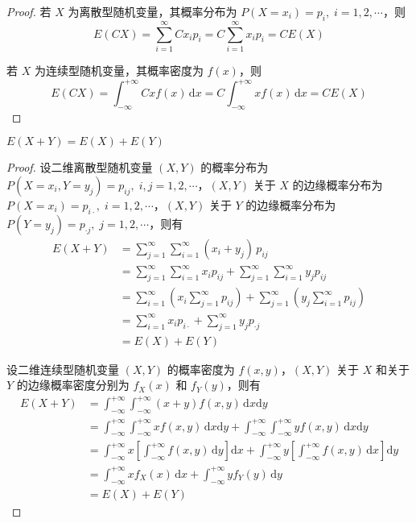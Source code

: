 \begin{proof}
    若 $X$ 为离散型随机变量，其概率分布为 $P(X=x_i)=p_i, \; i=1,2,\cdots$，则
    $$
    E(CX) = \sum_{i=1}^{\infty} C x_i p_i = C \sum_{i=1}^{\infty} x_i p_i = CE(X)
    $$

    若 $X$ 为连续型随机变量，其概率密度为 $f(x)$，则
    $$
    E(CX) = \int_{-\infty}^{+\infty} Cx f(x) \, \text{d}x = C \int_{-\infty}^{+\infty} x f(x) \, \text{d}x = CE(X)
    $$
\end{proof}

\begin{property}[][][property:E(X+Y)=E(X)+E(Y)]
    \indent $E(X+Y)=E(X)+E(Y)$
\end{property}

\begin{proof}
    设二维离散型随机变量 $(X,Y)$ 的概率分布为 $P(X=x_i,Y=y_j) = p_{ij}, \; i,j=1,2,\cdots$，$(X,Y)$ 关于 $X$ 的边缘概率分布为 $P(X=x_i)=p_{i\cdot}, \; i=1,2,\cdots$，$(X,Y)$ 关于 $Y$ 的边缘概率分布为 $P(Y=y_j)=p_{\cdot j}, \; j=1,2,\cdots$，则有
    $$
    \begin{aligned}
        E(X+Y) &= \sum_{j=1}^{\infty} \sum_{i=1}^{\infty} (x_i + y_j) \, p_{ij} \\
        &= \sum_{j=1}^{\infty} \sum_{i=1}^{\infty} x_i p_{ij} + \sum_{j=1}^{\infty} \sum_{i=1}^{\infty} y_j p_{ij} \\
        &= \sum_{i=1}^{\infty} \left( x_i \sum_{j=1}^{\infty} p_{ij} \right) + \sum_{j=1}^{\infty} \left( y_j \sum_{i=1}^{\infty} p_{ij} \right) \\
        &= \sum_{i=1}^{\infty} x_i p_{i \cdot} + \sum_{j=1}^{\infty} y_j p_{\cdot j} \\
        &= E(X)+E(Y)
    \end{aligned}
    $$

    设二维连续型随机变量 $(X,Y)$ 的概率密度为 $f(x,y)$，$(X,Y)$ 关于 $X$ 和关于 $Y$ 的边缘概率密度分别为 $f_X(x)$ 和 $f_Y(y)$，则有
    $$
    \begin{aligned}
        E(X+Y) &= \int_{-\infty}^{+\infty} \int_{-\infty}^{+\infty} (x+y) f(x,y) \, \text{d}x \text{d}y \\
        &= \int_{-\infty}^{+\infty} \int_{-\infty}^{+\infty} x f(x,y) \, \text{d}x \text{d}y + \int_{-\infty}^{+\infty} \int_{-\infty}^{+\infty} y f(x,y) \, \text{d}x \text{d}y \\
        &= \int_{-\infty}^{+\infty} x \left[ \int_{-\infty}^{+\infty} f(x,y) \, \text{d}y \right] \text{d}x + \int_{-\infty}^{+\infty} y \left[ \int_{-\infty}^{+\infty} f(x,y) \, \text{d}x \right] \text{d}y \\
        &= \int_{-\infty}^{+\infty} x f_X(x) \, \text{d}x + \int_{-\infty}^{+\infty} y f_Y(y) \, \text{d}y \\
        &= E(X)+E(Y)
    \end{aligned}
    $$
\end{proof}

